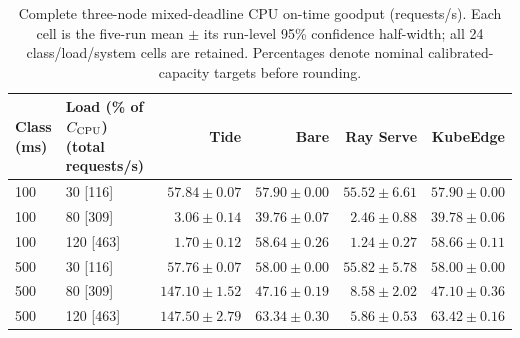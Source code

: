 \begin{table}[htbp]
\centering\small
\caption{Complete three-node mixed-deadline CPU on-time goodput (requests/s). Each cell is the five-run mean $\pm$ its run-level 95\% confidence half-width; all 24 class/load/system cells are retained. Percentages denote nominal calibrated-capacity targets before rounding.}
\label{tab:three-node-mixed}
\setlength{\tabcolsep}{4pt}
\begin{tabular*}{\linewidth}{@{\extracolsep{\fill}}llrrrr@{}}
\toprule
\shortstack{Class\\(ms)} & \shortstack{Load (\% of $C_{\rm CPU}$)\\(total requests/s)} & Tide & Bare & Ray Serve & KubeEdge\\
\midrule
100 & 30 [116] & $57.84 \pm 0.07$ & $57.90 \pm 0.00$ & $55.52 \pm 6.61$ & $57.90 \pm 0.00$\\
100 & 80 [309] & $3.06 \pm 0.14$ & $39.76 \pm 0.07$ & $2.46 \pm 0.88$ & $39.78 \pm 0.06$\\
100 & 120 [463] & $1.70 \pm 0.12$ & $58.64 \pm 0.26$ & $1.24 \pm 0.27$ & $58.66 \pm 0.11$\\
\midrule
500 & 30 [116] & $57.76 \pm 0.07$ & $58.00 \pm 0.00$ & $55.82 \pm 5.78$ & $58.00 \pm 0.00$\\
500 & 80 [309] & $147.10 \pm 1.52$ & $47.16 \pm 0.19$ & $8.58 \pm 2.02$ & $47.10 \pm 0.36$\\
500 & 120 [463] & $147.50 \pm 2.79$ & $63.34 \pm 0.30$ & $5.86 \pm 0.53$ & $63.42 \pm 0.16$\\
\bottomrule
\end{tabular*}
\end{table}
